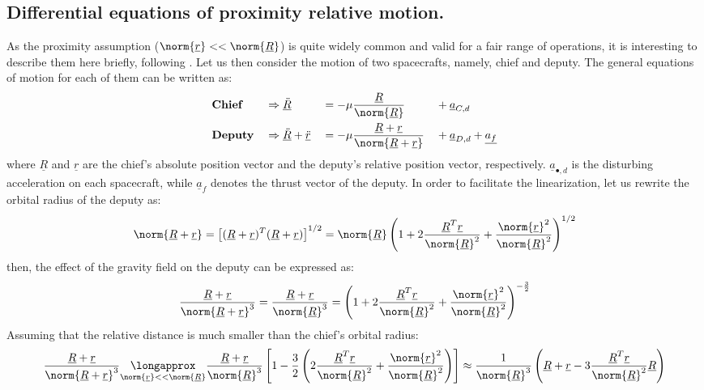 	\subsection{Differential equations of proximity relative motion.} \label{sec: Diff_eqs_prox}
	\indent As the proximity assumption ($\norm{\underline{r}} <<\norm{\underline{R}}$) is quite widely common and valid for a fair range of operations, it is interesting to describe them here briefly, following \cite{Yamanaka_Ankersen}. Let us then consider the motion of two spacecrafts, namely, chief and deputy. The general equations of motion for each of them can be written as:
	\begin{alignat}{4}
	&\textbf{Chief} 		&& \Rightarrow   \underline{\ddot{R}}   && = - \mu \dfrac{\underline{R}}{\norm{\underline{R}}} &&+ \underline{a}_{C, d} \label{eqCh2:chief_eq} \\
	&\textbf{Deputy} 		&& \Rightarrow   \underline{\ddot{R}} + \underline{\ddot{r}}  && =  - \mu \dfrac{\underline{R} + \underline{r}}{\norm{\underline{R} + \underline{r}}} && + \underline{a}_{D, d} + \underline{a_f}  \label{eqCh2:deputy_eq}
	\end{alignat}
	\noindent where $\underline{R}$ and $\underline{r}$ are the chief's absolute position vector and the deputy's relative position vector, respectively. $\underline{a}_{\bullet, d}$ is the disturbing acceleration on each spacecraft, while $\underline{a}_f$ denotes the thrust vector of the deputy. In order to facilitate the linearization, let us rewrite the orbital radius of the deputy as:
	\[
	\norm{\underline{R} + \underline{r}} = \left[ (\underline{R} + \underline{r})^T (\underline{R} + \underline{r}) \right]^{1/2} = \norm{\underline{R}} \left( 1 + 2 \dfrac{\underline{R}^T \underline{r}}{\norm{\underline{R}}^2} + \dfrac{\norm{\underline{r}}^2}{\norm{\underline{R}}^2} \right)^{1/2}
	\]
	\noindent then, the effect of the gravity field on the deputy can be expressed as:
	\[
	\dfrac{\underline{R} + \underline{r}}{\norm{\underline{R} + \underline{r}}^{3}} = \dfrac{\underline{R} + \underline{r}}{\norm{\underline{R}}^{3}} = \left( 1 + 2 \dfrac{\underline{R}^T \underline{r}}{\norm{\underline{R}}^2} + \dfrac{\norm{\underline{r}}^2}{\norm{\underline{R}}^2} \right)^{-\frac{3}{2}}
	\]
	\indent Assuming that the relative distance is much smaller than the chief's orbital radius:
	\begin{equation}
	\dfrac{\underline{R} + \underline{r}}{\norm{\underline{R} + \underline{r}}^{3}} \underset{\tiny{\norm{\underline{r}} << \norm{\underline{R}}}}{\longapprox} \dfrac{\underline{R} + \underline{r}}{\norm{\underline{R}}^{3}} \left[1 - \frac{3}{2} \left( 2 \dfrac{\underline{R}^T \underline{r}}{\norm{\underline{R}}^2} + \dfrac{\norm{\underline{r}}^2}{\norm{\underline{R}}^2} \right) \right] \approx  \dfrac{1}{\norm{\underline{R}}^{3}} \left(\underline{R} + \underline{r} - 3 \dfrac{\underline{R}^T \underline{r}}{\norm{\underline{R}}^2} \underline{R} \right)
	\label{eqCh2: 	Rplusr}
	\end{equation}
